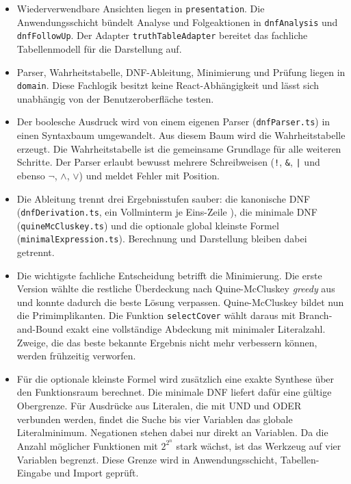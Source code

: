 \begin{itemize}
  \item Wiederverwendbare Ansichten liegen in \texttt{presentation}. Die
  Anwendungsschicht bündelt Analyse und Folgeaktionen in
  \texttt{dnf\allowbreak{}Analysis} und \texttt{dnf\allowbreak{}FollowUp}.\newline
  Der Adapter \mbox{\texttt{truthTableAdapter}} bereitet das fachliche Tabellenmodell
  für die Darstellung auf.

  \item Parser, Wahrheitstabelle, DNF-Ableitung, Minimierung und Prüfung liegen in
  \texttt{domain}. Diese Fachlogik besitzt keine React-Abhängigkeit und lässt sich
  unabhängig von der Benutzeroberfläche testen.

  \item Der boolesche Ausdruck wird von einem eigenen Parser (\texttt{dnfParser.ts}) in
  einen Syntaxbaum umgewandelt. Aus diesem Baum wird die Wahrheitstabelle erzeugt. Die
  Wahrheitstabelle ist die gemeinsame Grundlage für alle weiteren Schritte. Der Parser
  erlaubt bewusst mehrere Schreibweisen (\texttt{!}, \texttt{\&}, \texttt{|} und ebenso
  \(\lnot\), \(\land\), \(\lor\)) und meldet Fehler mit Position.

  \item Die Ableitung trennt drei Ergebnisstufen sauber: die kanonische DNF
  (\texttt{dnfDerivation.ts}, ein Vollminterm je Eins-Zeile \cite[S.~163]{schiffmann2003}), die minimale DNF
  (\texttt{quineMcCluskey.ts}) und die optionale global kleinste Formel
  (\texttt{minimalExpression.ts}). Berechnung und Darstellung bleiben dabei getrennt.

  \item Die wichtigste fachliche Entscheidung betrifft die Minimierung. Die erste Version
  wählte die restliche Überdeckung nach Quine-McCluskey
  \cite[S.~172]{schiffmann2003} \emph{greedy} aus und konnte dadurch die beste Lösung
  verpassen. Quine-McCluskey bildet nun die Primimplikanten. Die Funktion
  \texttt{selectCover} wählt daraus mit Branch-and-Bound exakt eine vollständige
  Abdeckung mit minimaler Literalzahl. Zweige, die das beste bekannte Ergebnis nicht
  mehr verbessern können, werden frühzeitig verworfen.

  \item Für die optionale kleinste Formel wird zusätzlich eine exakte Synthese über den
  Funktionsraum berechnet. Die minimale DNF liefert dafür eine gültige Obergrenze. Für
  Ausdrücke aus Literalen, die mit UND und ODER verbunden werden, findet die Suche bis
  vier Variablen das globale Literalminimum. Negationen stehen dabei nur direkt an
  Variablen. Da die Anzahl möglicher Funktionen mit \(2^{2^{n}}\) stark wächst, ist das
  Werkzeug auf vier Variablen begrenzt. Diese Grenze wird in Anwendungsschicht,
  Tabellen-Eingabe und Import geprüft.


\end{itemize}
